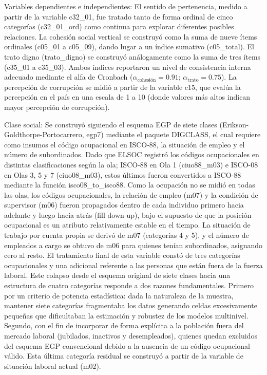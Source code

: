 \documentclass[
  spanish,
  a4paper,
  oneside]{scrbook}
\begin{document}
Variables dependientes e independientes: El sentido de pertenencia,
medido a partir de la variable c32\_01, fue tratado tanto de forma
ordinal de cinco categorías (c32\_01\_ord) como continua para explorar
diferentes posibles relaciones. La cohesión social vertical se construyó
como la suma de nueve ítems ordinales (c05\_01 a c05\_09), dando lugar a
un índice sumativo (c05\_total). El trato digno (trato\_digno) se
construyó análogamente como la suma de tres ítems (c35\_01 a c35\_03).
Ambos índices reportaron un nivel de consistencia interna adecuado
mediante el alfa de Cronbach (\(\alpha_{\text{cohesión}} = 0.91\);
\(\alpha_{\text{trato}} = 0.75\)). La percepción de corrupción se midió
a partir de la variable c15, que evalúa la percepción en el país en una
escala de 1 a 10 (donde valores más altos indican mayor percepción de
corrupción).

Clase social: Se construyó siguiendo el esquema EGP de siete clases
(Erikson-Goldthorpe-Portocarrero, egp7) mediante el paquete DIGCLASS, el
cual requiere como insumos el código ocupacional en ISCO-88, la
situación de empleo y el número de subordinados. Dado que ELSOC registró
los códigos ocupacionales en distintas clasificaciones según la ola;
ISCO-88 en Ola 1 (ciuo88\_m03) e ISCO-08 en Olas 3, 5 y 7 (ciuo08\_m03),
estos últimos fueron convertidos a ISCO-88 mediante la función
isco08\_to\_isco88. Como la ocupación no se midió en todas las olas, los
códigos ocupacionales, la relación de empleo (m07) y la condición de
supervisor (m06) fueron propagados dentro de cada individuo primero
hacia adelante y luego hacia atrás (fill down-up), bajo el supuesto de
que la posición ocupacional es un atributo relativamente estable en el
tiempo. La situación de trabajo por cuenta propia se derivó de m07
(categorías 4 y 5), y el número de empleados a cargo se obtuvo de m06
para quienes tenían subordinados, asignando cero al resto. El
tratamiento final de esta variable constó de tres categorías
ocupacionales y una adicional referente a las personas que están fuera
de la fuerza laboral. Este colapso desde el esquema original de siete
clases hacia una estructura de cuatro categorías responde a dos razones
fundamentales. Primero por un criterio de potencia estadística: dada la
naturaleza de la muestra, mantener siete categorías fragmentaba los
datos generando celdas excesivamente pequeñas que dificultaban la
estimación y robustez de los modelos multinivel. Segundo, con el fin de
incorporar de forma explícita a la población fuera del mercado laboral
(jubilados, inactivos y desempleados), quienes quedan excluidos del
esquema EGP convencional debido a la ausencia de un código ocupacional
válido. Esta última categoría residual se construyó a partir de la
variable de situación laboral actual (m02).
\end{document}
